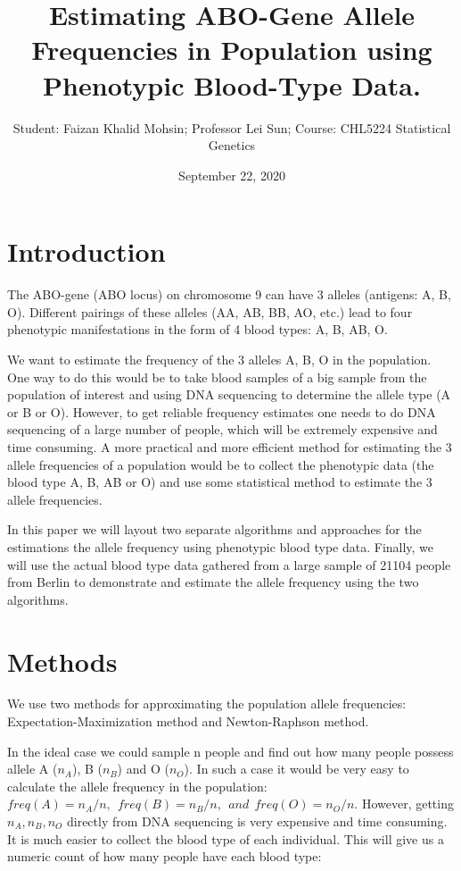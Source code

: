 \documentclass[]{article}
\title{Estimating ABO-Gene Allele Frequencies in Population using Phenotypic
Blood-Type Data.}
\author{Student: Faizan Khalid Mohsin; Professor Lei Sun; Course: CHL5224
Statistical Genetics}
\date{September 22, 2020}
\begin{document}
\maketitle

\section{Introduction}\label{introduction}

The ABO-gene (ABO locus) on chromosome 9 can have 3 alleles (antigens:
A, B, O). Different pairings of these alleles (AA, AB, BB, AO, etc.)
lead to four phenotypic manifestations in the form of 4 blood types: A,
B, AB, O.

We want to estimate the frequency of the 3 alleles A, B, O in the
population. One way to do this would be to take blood samples of a big
sample from the population of interest and using DNA sequencing to
determine the allele type (A or B or O). However, to get reliable
frequency estimates one needs to do DNA sequencing of a large number of
people, which will be extremely expensive and time consuming. A more
practical and more efficient method for estimating the 3 allele
frequencies of a population would be to collect the phenotypic data (the
blood type A, B, AB or O) and use some statistical method to estimate
the 3 allele frequencies.

In this paper we will layout two separate algorithms and approaches for
the estimations the allele frequency using phenotypic blood type data.
Finally, we will use the actual blood type data gathered from a large
sample of 21104 people from Berlin to demonstrate and estimate the
allele frequency using the two algorithms.

\section{Methods}\label{methods}

We use two methods for approximating the population allele frequencies:
Expectation-Maximization method and Newton-Raphson method.

In the ideal case we could sample n people and find out how many people
possess allele A (\(n_A\)), B (\(n_B\)) and O (\(n_O\)). In such a case
it would be very easy to calculate the allele frequency in the
population:
\(freq(A) = n_A/n, \: \: freq(B) = n_B/n,\: \: and \: \:freq(O) = n_O/n\).
However, getting \(n_A, n_B, n_O\) directly from DNA sequencing is very
expensive and time consuming. It is much easier to collect the blood
type of each individual. This will give us a numeric count of how many
people have each blood type:
\end{document}
